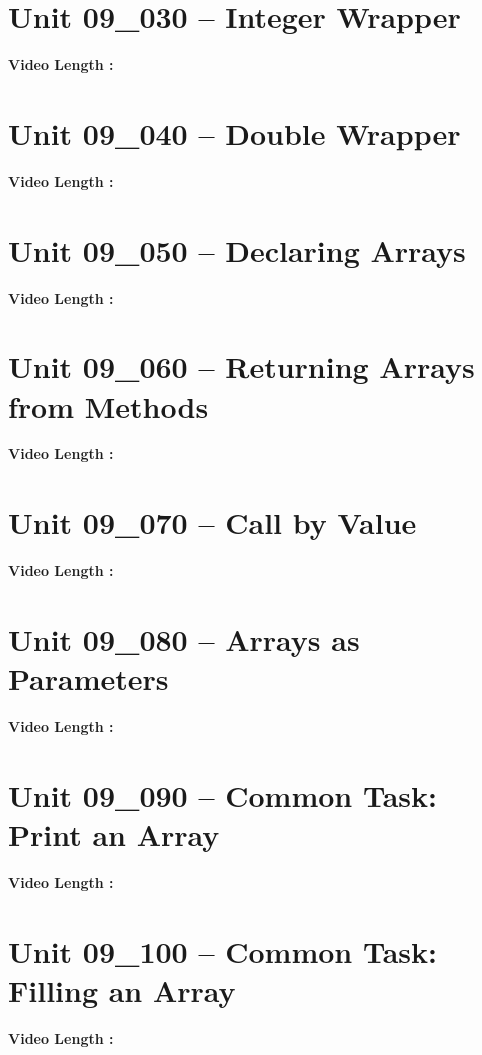 \documentclass[letterpaper,12pt]{exam}
\newcommand{\unit}{Unit 09}
\begin{document}
\begin{questions}
\section*{\unit\_030 -- Integer Wrapper} 
\par{\selectfont\textbf{Video Length :}}

\section*{\unit\_040 -- Double Wrapper } 
\par{\selectfont\textbf{Video Length :}}

\section*{\unit\_050 -- Declaring Arrays} 
\par{\selectfont\textbf{Video Length :}}

\section*{\unit\_060 -- Returning Arrays from Methods} 
\par{\selectfont\textbf{Video Length :}}

\section*{\unit\_070 -- Call by Value } 
\par{\selectfont\textbf{Video Length :}}

\section*{\unit\_080 -- Arrays as Parameters} 
\par{\selectfont\textbf{Video Length :}}

\section*{\unit\_090 -- Common Task: Print an Array} 
\par{\selectfont\textbf{Video Length :}}

\section*{\unit\_100 -- Common Task: Filling an Array} 
\par{\selectfont\textbf{Video Length :}}

\end{questions}
\end{document}
